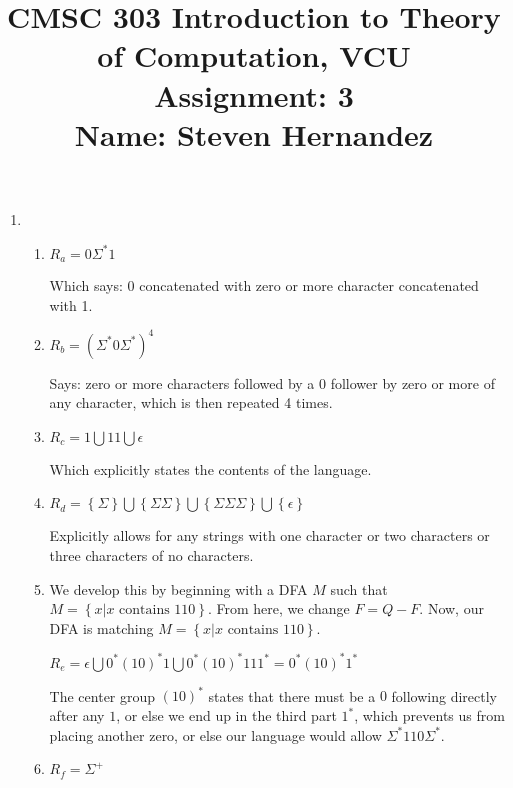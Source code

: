 \documentclass{article}
\newcommand{\set}[1]{{\left\{#1\right\}}}    %
\begin{document}
\title{
    CMSC 303 Introduction to Theory of Computation, VCU\\
    Assignment: 3\\
    Name: Steven Hernandez
}

\date{}

\maketitle
\vspace{-10mm}

\begin{enumerate}
    \item %
        \begin{enumerate}
            \item
                $R_a = 0\Sigma^*1$

                Which says: $0$ concatenated with zero or more character concatenated with 1.
            \item
                $R_b = (\Sigma^*0\Sigma^*)^4$

                Says: zero or more characters followed by a $0$ follower by zero or more of any character, which is then repeated 4 times.
            \item
                $R_c = 1 \bigcup 11 \bigcup \epsilon$

                Which explicitly states the contents of the language.
            \item
                $R_d = \set{\Sigma} \bigcup \set{\Sigma\Sigma} \bigcup \set{\Sigma\Sigma\Sigma} \bigcup \set{\epsilon}$

                Explicitly allows for any strings with one character or two characters or three characters of no characters.
            \item
                We develop this by beginning with a DFA $M$ such that $M = \set{x | x \text{ contains } 110}$.
                From here, we change $F = Q - F$. Now, our DFA is matching $M = \set{x | x \text{ contains } 110}$.

                $R_e = \epsilon \bigcup 0^*(10)^*1 \bigcup 0^*(10)^*111^* = 0^*(10)^*1^*$ %

                The center group $(10)^*$ states that there must be a $0$ following directly after any $1$, or else we end up in the third part $1^*$, which prevents us from placing another zero, or else our language would allow $\Sigma^*110\Sigma^*$.
            \item
                $R_f = \Sigma^+$


\end{enumerate}
\end{enumerate}
\end{document}
